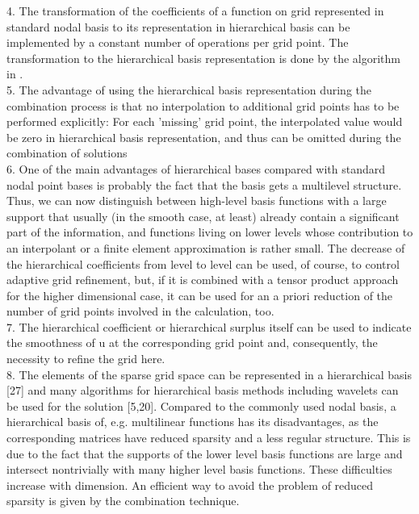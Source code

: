 4. The transformation of the coefficients of a function on grid represented in standard nodal basis to its representation in hierarchical basis can be implemented by a constant number of operations per grid point. The transformation to the hierarchical basis representation is done by the algorithm in \cite{Griebel1992b}. \\

5. The advantage of using the hierarchical basis representation during the combination process is that no interpolation to additional grid points has to be performed explicitly: For each 'missing' grid point, the interpolated value would be zero in hierarchical basis representation, and thus can be omitted during the combination of solutions\cite{Griebel1995} \\

6. One of the main advantages of hierarchical bases compared with standard nodal point bases is probably the fact that the basis gets a multilevel structure. Thus, we can now distinguish between high-level basis functions with a large support that usually (in the smooth case, at least) already contain a significant part of the information, and functions living on lower levels whose contribution to an interpolant or a finite element approximation is rather small. The decrease of the hierarchical coefficients from level to level can be used, of course, to control adaptive grid refinement, but, if it is combined with a tensor product approach for the higher dimensional case, it can be used for an a priori reduction of the number of grid points involved in the calculation, too.\cite{Bungartz1998}\\

7. The hierarchical coefficient or hierarchical surplus itself can be used to indicate the smoothness of u at the corresponding grid point and, consequently, the necessity to refine the grid here.\cite{Bungartz1998}\\

8. The elements of the sparse grid space can be represented in a hierarchical basis [27] and many algorithms for hierarchical basis methods including wavelets can be used for the solution [5,20]. Compared to the commonly used nodal basis, a hierarchical basis of, e.g. multilinear functions has its disadvantages, as the corresponding matrices have reduced sparsity and a less regular structure. This is due to the fact that the supports of the lower level basis functions are large and intersect nontrivially with many higher level basis functions. These difficulties increase with dimension.
An efficient way to avoid the problem of reduced sparsity is given by the combination technique. \cite{Hegland2007}\\



